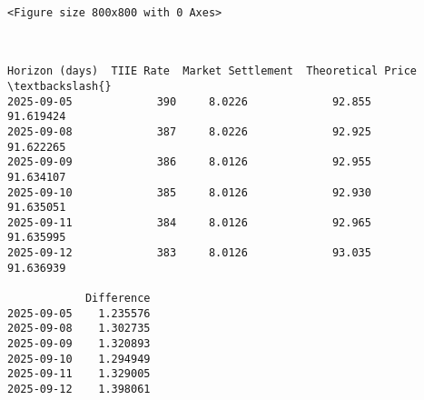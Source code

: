 \documentclass[11pt,a4paper]{article}
\makeatletter
\newcommand{\boxspacing}{\kern\kvtcb@left@rule\kern\kvtcb@boxsep}
\newcommand{\prompt}[4]{
        {\ttfamily\llap{{\color{#2}[#3]:\hspace{3pt}#4}}\vspace{-\baselineskip}}
    }
\makeatother
\begin{document}
    
    \begin{Verbatim}[commandchars=\\\{\}]
<Figure size 800x800 with 0 Axes>
    \end{Verbatim}

    
    \begin{center}
    \end{center}
    { \hspace*{\fill} \\}
    
            \begin{tcolorbox}[breakable, size=fbox, boxrule=.5pt, pad at break*=1mm, opacityfill=0]
\prompt{Out}{outcolor}{55}{\boxspacing}
\begin{Verbatim}[commandchars=\\\{\}]
            Horizon (days)  TIIE Rate  Market Settlement  Theoretical Price  \textbackslash{}
2025-09-05             390     8.0226             92.855          91.619424
2025-09-08             387     8.0226             92.925          91.622265
2025-09-09             386     8.0126             92.955          91.634107
2025-09-10             385     8.0126             92.930          91.635051
2025-09-11             384     8.0126             92.965          91.635995
2025-09-12             383     8.0126             93.035          91.636939

            Difference
2025-09-05    1.235576
2025-09-08    1.302735
2025-09-09    1.320893
2025-09-10    1.294949
2025-09-11    1.329005
2025-09-12    1.398061
\end{Verbatim}
\end{tcolorbox}
        

    
    
    
\end{document}
